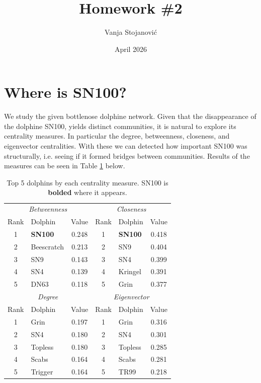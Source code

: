 \documentclass[12pt]{article}
\title{Homework \#2}
\author{Vanja Stojanovi\'c}
\date{April 2026}
\theoremstyle{definition}
\begin{document}
\maketitle

\section{Where is SN100?}

We study the given bottlenose dolphine network. Given that the disappearance of the dolphine SN100, yields distinct communities, it is natural to explore its centrality measures. In particular the degree, betweenness, closeness, and eigenvector centralities. With these we can detected how important SN100 was structurally, i.e. seeing if it formed bridges between communities. Results of the measures can be seen in Table \ref{tab:centrality} below.

\begin{table}[h]
\centering
\caption{Top 5 dolphins by each centrality measure. SN100 is \textbf{bolded} where it appears.}
\label{tab:centrality}
\begin{tabular}{@{}clc|clc@{}}
\toprule
\multicolumn{3}{c|}{\textit{Betweenness}} & \multicolumn{3}{c}{\textit{Closeness}} \\
Rank & Dolphin & Value & Rank & Dolphin & Value \\
\midrule
1 & \textbf{SN100}  & 0.248 & 1 & \textbf{SN100} & 0.418 \\
2 & Beescratch      & 0.213 & 2 & SN9            & 0.404 \\
3 & SN9             & 0.143 & 3 & SN4            & 0.399 \\
4 & SN4             & 0.139 & 4 & Kringel        & 0.391 \\
5 & DN63            & 0.118 & 5 & Grin           & 0.377 \\
\midrule
\multicolumn{3}{c|}{\textit{Degree}} & \multicolumn{3}{c}{\textit{Eigenvector}} \\
Rank & Dolphin & Value & Rank & Dolphin & Value \\
\midrule
1 & Grin            & 0.197 & 1 & Grin           & 0.316 \\
2 & SN4             & 0.180 & 2 & SN4            & 0.301 \\
3 & Topless         & 0.180 & 3 & Topless        & 0.285 \\
4 & Scabs           & 0.164 & 4 & Scabs          & 0.281 \\
5 & Trigger         & 0.164 & 5 & TR99           & 0.218 \\
\bottomrule
\end{tabular}
\end{table}
\end{document}

